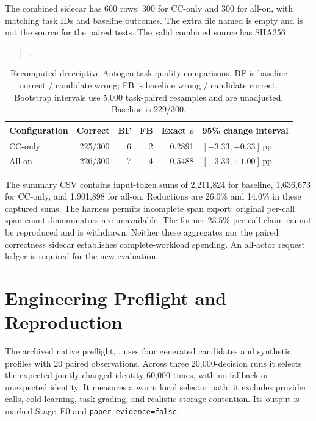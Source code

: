 The combined sidecar  has 600 rows:
300 for CC-only and 300 for all-on, with matching task IDs and baseline outcomes.
The extra file named  is empty and is
not the source for the paired tests. The valid combined source has SHA256
\begin{quote}\small
{}.
\end{quote}

\begin{table}[t]
\caption{Recomputed descriptive Autogen task-quality comparisons. BF is baseline
correct / candidate wrong; FB is baseline wrong / candidate correct. Bootstrap
intervals use 5,000 task-paired resamples and are unadjusted. Baseline is 229/300.}
\label{tab:autogen}
\small
\begin{tabularx}{\textwidth}{@{} L r r r r l @{}}
\toprule
Configuration & Correct & BF & FB & Exact $p$ & 95\% change interval \\
\midrule
CC-only & 225/300 & 6 & 2 & 0.2891 & $[-3.33,+0.33]$\,pp \\
All-on & 226/300 & 7 & 4 & 0.5488 & $[-3.33,+1.00]$\,pp \\
\bottomrule
\end{tabularx}
\end{table}

The summary CSV contains input-token sums of 2,211,824 for baseline, 1,636,673 for
CC-only, and 1,901,898 for all-on. Reductions are 26.0\% and 14.0\% in these
captured sums. The harness permits incomplete span export; original per-call
span-count denominators are unavailable. The former 23.5\% per-call claim cannot
be reproduced and is withdrawn. Neither these aggregates nor the paired correctness
sidecar establishes complete-workload spending. An all-actor request ledger is
required for the new evaluation.

\section{Engineering Preflight and Reproduction}
\label{sec:repro}

The archived native preflight, ,
uses four generated candidates and synthetic profiles with 20 paired observations.
Across three 20,000-decision runs it selects the expected jointly changed identity
60,000 times, with no fallback or unexpected identity. It measures a warm local
selector path; it excludes provider calls, cold learning, task grading, and realistic
storage contention. Its output is marked Stage~E0 and \texttt{paper\_evidence=false}.

